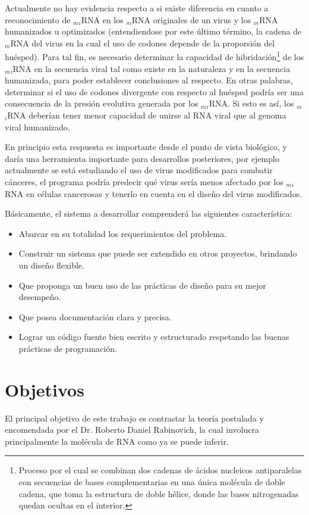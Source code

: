 \par Actualmente no hay evidencia respecto a si existe diferencia en cuanto a reconocimiento de $_m$$_i$RNA en los $_m$RNA originales de un virus y los $_m$RNA humanizados u optimizados (entendiendose por este último término, la cadena de $_m$RNA del virus en la cual el uso de codones depende de la proporsión del huésped). Para tal fin, es necesario determinar la capacidad de hibridación\footnote{Proceso por el cual se combinan dos cadenas de ácidos nucleicos antiparalelas con secuencias de bases complementarias en una única molécula de doble cadena, que toma la estructura de doble hélice, donde las bases nitrogenadas quedan ocultas en el interior.} de los $_m$$_i$RNA en la secuencia viral tal como existe en la naturaleza y en la secuencia humanizada, para poder establecer conclusiones al respecto. En otras palabras, determinar si el uso de codones divergente con respecto al huésped podría ser una consecuencia de la presión evolutiva generada por los $_m$$_i$RNA. Si esto es así, los $_m$$_i$RNA deberían tener menor capacidad de unirse al RNA viral que al genoma viral humanizado. 

\par En principio esta respuesta es importante desde el punto de vista biológico, y daría una herramienta importante para desarrollos posteriores, por ejemplo actualmente se está estudiando el uso de virus modificados para combatir cánceres, el programa podría predecir qué virus sería menos afectado por los $_m$$_i$RNA en células cancerosas y tenerlo en cuenta en el diseño del virus modificados.

\par Básicamente, el sistema a desarrollar comprenderá las siguientes característica:
\begin{itemize}
	\item Abarcar en su totalidad los requerimientos del problema.
	\item Construir un sistema que puede ser extendido en otros proyectos, brindando un diseño flexible. 
	\item Que proponga un buen uso de las prácticas de diseño para su mejor desempeño.
	\item Que posea documentación clara y precisa.
	\item Lograr un código fuente bien escrito y estructurado respetando las buenas prácticas de programación.
\end{itemize}

\section{Objetivos}
\par El principal objetivo de este trabajo es contrastar la teoría postulada y encomendada por el Dr. Roberto Daniel Rabinovich, la cual involucra principalmente la molécula de RNA como ya se puede inferir. 

